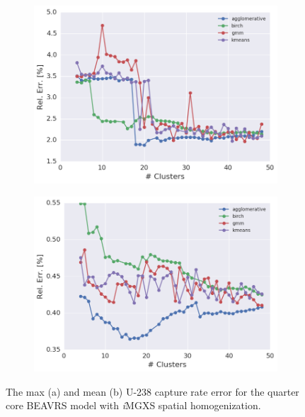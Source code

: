 \begin{figure}[h!]
\centering
\begin{subfigure}{0.9\textwidth}
  \centering
  \includegraphics[width=\linewidth]{figures/results/err-by-cluster/full-core/max-rel-err}
  \caption{}
  \label{fig:max-capt-err-by-cluster-full-core}
\end{subfigure}
\begin{subfigure}{0.9\textwidth}
  \centering
  \includegraphics[width=\linewidth]{figures/results/err-by-cluster/full-core/mean-rel-err}
  \caption{}
  \label{fig:mean-capt-err-by-cluster-full-core}
\end{subfigure}
\caption[U-238 capture rate error variation with the number of clusters]{The max (a) and mean (b) U-238 capture rate error for the quarter core \ac{BEAVRS} model with \textit{i}\ac{MGXS} spatial homogenization.}
\label{fig:capt-err-by-cluster-full-core}
\end{figure}

